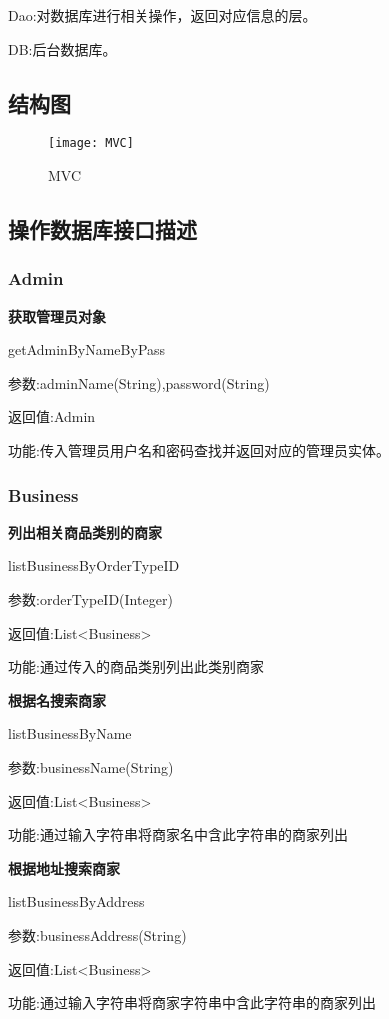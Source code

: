 Dao:对数据库进行相关操作，返回对应信息的层。

DB:后台数据库。

\subsection{结构图}

\begin{figure}[htbp]
	\centering
	\texttt{[image: MVC]}
	\caption{MVC}\label{fig:MVC}
	\vspace{\baselineskip}
\end{figure}

\subsection{操作数据库接口描述}

\subsubsection{Admin}
\textbf{获取管理员对象}

getAdminByNameByPass

参数:adminName(String),password(String)

返回值:Admin

功能:传入管理员用户名和密码查找并返回对应的管理员实体。

\subsubsection{Business}
\textbf{列出相关商品类别的商家}

listBusinessByOrderTypeID

参数:orderTypeID(Integer)

返回值:List<Business>

功能:通过传入的商品类别列出此类别商家

\textbf{根据名搜索商家}

listBusinessByName

参数:businessName(String)

返回值:List<Business>

功能:通过输入字符串将商家名中含此字符串的商家列出

\textbf{根据地址搜索商家}

listBusinessByAddress

参数:businessAddress(String)

返回值:List<Business>

功能:通过输入字符串将商家字符串中含此字符串的商家列出

